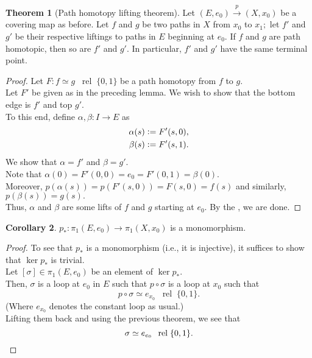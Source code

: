 \documentclass[12pt]{article}
\theoremstyle{definition}
\newtheorem{thm}{Theorem}
\numberwithin{thm}{section}
\newtheorem{cor}[thm]{Corollary}
\newcommand{\rel}{\;\;\operatorname{rel}\;}
\begin{document}
\begin{thm} [Path homotopy lifting theorem] \label{thm:pathhomotlifts}
	Let $(E, e_0) \overset{p}{\longrightarrow} (X, x_0)$ be a covering map as before. Let $f$ and $g$ be two paths in $X$ from $x_0$ to $x_1;$ let $f'$ and $g'$ be their respective liftings to paths in $E$ beginning at $e_0.$ If $f$ and $g$ are path homotopic, then so are $f'$ and $g'.$ In particular, $f'$ and $g'$ have the same terminal point.
\end{thm}
\begin{proof} 
	Let $F:f\simeq g \rel \{0, 1\}$ be a path homotopy from $f$ to $g.$\\
	Let $F'$ be given as in the preceding lemma. We wish to show that the bottom edge is $f'$ and top $g'.$\\
	To this end, define $\alpha, \beta:I\to E$ as
	\begin{align*} 
		\alpha(s) &\vcentcolon= F'(s, 0),\\
		\beta(s) &\vcentcolon= F'(s, 1).
	\end{align*}
	We show that $\alpha = f'$ and $\beta = g'.$\\
	Note that $\alpha(0) = F'(0, 0) = e_0 = F'(0, 1) = \beta(0).$\\
	Moreover, $p(\alpha(s)) = p(F'(s, 0)) = F(s, 0) = f(s)$ and similarly, $p(\beta(s)) = g(s).$\\
	Thus, $\alpha$ and $\beta$ are some lifts of $f$ and $g$ starting at $e_0.$ By the , we are done.
\end{proof}
\begin{cor}
	$p_* : \pi_1(E, e_0) \to \pi_1(X, x_0)$ is a monomorphism.
\end{cor}
\begin{proof} 
	To see that $p_*$ is a monomorphism (i.e., it is injective), it suffices to show that $\ker p_*$ is trivial.\\
	Let $[\sigma] \in \pi_1(E, e_0)$ be an element of $\ker p_*.$\\
	Then, $\sigma$ is a loop at $e_0$ in $E$ such that $p \circ \sigma$ is a loop at $x_0$ such that
	\begin{equation*} 
		p\circ \sigma \simeq e_{x_0} \rel \{0, 1\}.
	\end{equation*}
	(Where $e_{x_0}$ denotes the constant loop as usual.)\\
	Lifting them back and using the previous theorem, we see that
	\begin{equation*} 
		\sigma \simeq e_{e_0} \rel \{0, 1\}. \qedhere
	\end{equation*}
\end{proof}
\end{document}
